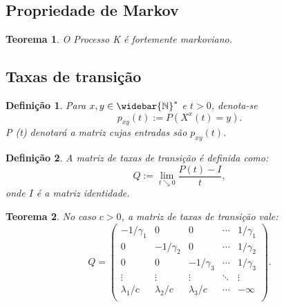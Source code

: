 \documentclass[xcolor=pdftex,dvipsnames]{beamer}
\newcommand{\Nzb}{{\mathbb{\widebar{N}^*}}}
\newtheorem{teorema}{Teorema}
\newtheorem{definicao}{Definição}
\begin{document}
\subsection{Propriedade de Markov}

\begin{frame}
  \begin{teorema}
    O Processo K é fortemente markoviano.
  \end{teorema}
\end{frame}


\subsection{Taxas de transição}

\begin{frame}
  \begin{definicao}
    Para $x, y \in \Nzb$ e $t > 0$, denota-se
    \begin{displaymath}
      p_{x y} (t) := P \left( X^x(t) = y \right).
    \end{displaymath}
    P (t) denotará a matriz cujas entradas são $p_{x y} (t)$.
  \end{definicao} \pause
  \begin{definicao}
    A matriz de taxas de transição é definida como:
    \begin{displaymath}
      Q := \lim_{t \searrow 0} \frac{P(t) - I}{t},
    \end{displaymath}
    onde $I$ é a matriz identidade.
  \end{definicao}
\end{frame}

\begin{frame}
  \begin{teorema}
    No caso $c > 0$, a matriz de taxas de transição vale:
    \begin{displaymath}
      Q = \left(
        \begin{array}{ccccc}
          -1/\gamma_1 & 0 & 0 & \cdots & 1/\gamma_1\\
          0 & -1/\gamma_2 & 0 & \cdots & 1/\gamma_2\\
          0 & 0 & -1/\gamma_3 & \cdots & 1/\gamma_3\\
          \vdots & \vdots & \vdots & \ddots & \vdots \\
          \lambda_1/c & \lambda_2/c &
          \lambda_3/c & \cdots & -\infty\\
        \end{array}
      \right).
    \end{displaymath}
  \end{teorema}
\end{frame}
\end{document}
